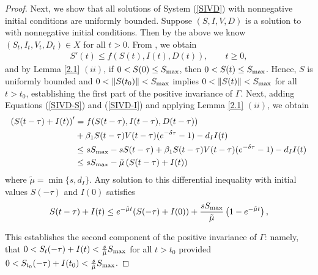 \documentclass{CMHPhD-SIVD}
\begin{document}
\begin{proof}
%





Next, we show that all solutions of System (\ref{SIVD}) with nonnegative initial conditions are uniformly bounded.
	Suppose $(S, I,  V,  D)$ is a solution to  with nonnegative initial conditions.  Then by the above we know $(S_t,I_t,V_t,D_t)\in X$ for all $t >0$.
	From , we obtain
\begin{align*}
S'(t)\leq f(S(t), I(t), D(t)),   \qquad t\geq0,
\end{align*}
	and by Lemma \ref{2.1} $(ii)$, if $0<S(0)\leq S_{\text{max}}$, then $0< S(t)\leq S_{\text{max}}$.
	Hence, $S$ is uniformly bounded and $0 < \|S(t_0)\| < S_{\text{max}}$ implies $0 < \|S(t)\| < S_{\text{max}}$ for all $t>t_0$, establishing the first part of the positive invariance of $\Gamma$.
Next, adding Equations (\ref{SIVD-S}) and (\ref{SIVD-I}) and applying Lemma \ref{2.1} $(ii)$, we obtain
\begin{align}\label{37}
\left(S(t-\tau)+I(t)\right)'&=f(S(t-\tau), I(t-\tau), D(t-\tau))\nonumber \\
&+\beta_1 S(t-\tau)V(t-\tau)(e^{-\delta\tau}-1)-d_I I(t)\nonumber \\
&
\leq s S_{\text{max}}-s S(t-\tau)+\beta_1 S(t-\tau)V(t-\tau)(e^{-\delta\tau}-1)-d_I I(t)\nonumber \\
&
\leq s S_{\text{max}}-\tilde{\mu}\left(S(t-\tau)+I(t)\right)
\end{align}
where $\tilde{\mu}=\min\{s,d_I\}$. 
Any solution to this differential inequality with initial values $S(-\tau)$ and $I(0)$ satisfies
\begin{align*}
S(t-\tau)+I(t)\leq e^{-\tilde{\mu}t}(S(-\tau)+I(0))+\frac{s S_{\text{max}}}{\tilde{\mu}}\left(1-e^{-\tilde{\mu}t}\right),
\end{align*}

This establishes the second component of the positive invariance of $\Gamma$: namely, that $0 < S_t(-\tau) + I(t) < \frac{s}{\tilde{\mu}}S_{\text{max}}$ for all $t>t_0$ provided $0 < S_{t_0}(-\tau) + I(t_0) < \frac{s}{\tilde{\mu}}S_{\text{max}}$.








\end{proof}
\end{document}

